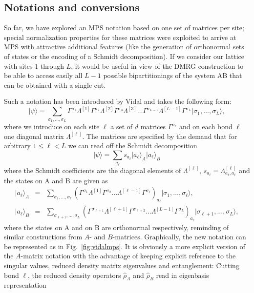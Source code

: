 \documentclass[a4paper,10pt,oneside,onecolumn,1p,times]{elsarticle}
\newcommand{\ket}[1]{\mbox{$| #1  \rangle$}}
\begin{document}
\subsection{Notations and conversions}
So far, we have explored an MPS notation based on one set of matrices per site; special normalization properties for these matrices were exploited to arrive at MPS with attractive additional features (like the generation of orthonormal sets of states or the encoding of a Schmidt decomposition). If we consider our lattice with sites $1$ through $L$, it would be useful in view of the DMRG construction to be able to access easily all $L-1$ possible bipartitionings of the system AB that can be obtained with a single cut. 

Such a notation has been introduced by Vidal\cite{Vidal03a} and takes the following form:
\begin{equation}
\ket{\psi} = \sum_{\sigma_1,\ldots,\sigma_L} \Gamma^{\sigma_1} \Lambda^{[1]}  \Gamma^{\sigma_2} \Lambda^{[2]}  \Gamma^{\sigma_3} \Lambda^{[3]} \ldots  \Gamma^{\sigma_{L-1}} \Lambda^{[L-1]}  \Gamma^{\sigma_L} \ket{\sigma_1,\ldots,\sigma_L} ,
\label{eq:canonicalform}
\end{equation} 
where we introduce on each site $\ell$ a set of $d$ matrices $\Gamma^{\sigma_\ell}$ and on each bond $\ell$ one diagonal matrix $\Lambda^{[\ell]}$. The matrices are specified by the demand that for arbitrary $1\leq \ell < L$ we can read off the Schmidt decomposition
\begin{equation}
\ket{\psi} = \sum_{a_\ell} s_{a_\ell} \ket{a_\ell}_A \ket{a_\ell}_B
\end{equation}
where the Schmidt coefficients are the diagonal elements of $\Lambda^{[\ell]}$, $s_{a_\ell} = \Lambda^{[\ell]}_{a_\ell,a_\ell}$ and the states on A and B are given as
\begin{eqnarray}
\ket{a_\ell}_A &=& \sum_{\sigma_1,\ldots,\sigma_\ell}
 (\Gamma^{\sigma_1}\Lambda^{[1]}\Gamma^{\sigma_2} \ldots \Lambda^{[\ell-1]} \Gamma^{\sigma_\ell})_{a_{\ell}}
\ket{\sigma_1,\ldots,\sigma_\ell}, \\
\ket{a_\ell}_B &=& \sum_{\sigma_{\ell+1},\ldots,\sigma_L} 
(\Gamma^{\sigma_{\ell+1}}\Lambda^{[\ell+1]}\Gamma^{\sigma_{\ell+2}} \ldots \Lambda^{[L-1]} \Gamma^{\sigma_L})_{a_\ell}
\ket{\sigma_{\ell+1},\ldots,\sigma_L},
\end{eqnarray}
where the states on A and on B are orthonormal respectively, reminding of similar constructions from $A$- and $B$-matrices. Graphically, the new notation can be represented as in Fig.~\ref{fig:vidalmps}. It is obviously a more explicit version of the $A$-matrix notation with the advantage of keeping explicit reference to the singular values, reduced density matrix eigenvalues and entanglement: Cutting bond $\ell$, the reduced density operators $\hat{\rho}_A$ and $\hat{\rho}_B$ read in eigenbasis representation
\end{document}
